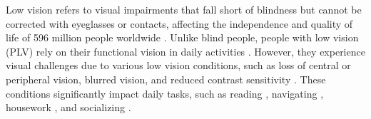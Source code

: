 Low vision refers to visual impairments that fall short of blindness but cannot be corrected with eyeglasses or contacts, affecting the independence and quality of life of 596 million people worldwide \cite{IAPBVisionAtlas}. Unlike blind people, people with low vision (PLV) rely on their functional vision in daily activities \cite{szpiro2016finding}. However, they experience visual challenges due to various low vision conditions, such as loss of central or peripheral vision, blurred vision, and reduced contrast sensitivity \cite{AOALowVision}. These conditions significantly impact daily tasks, such as reading \cite{wang2023understanding, wang2024gazeprompt}, navigating \cite{szpiro2016finding, zhao2020effectiveness}, housework \cite{jones2019analysis, wang2023practices}, and socializing \cite{senra2015psychologic, shah2020association}.


